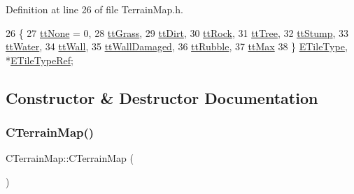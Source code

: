 Definition at line 26 of file Terrain\+Map.\+h.


\begin{DoxyCode}
26                     \{
27             \hyperlink{classCTerrainMap_aff2ab991e237269941416dd79d8871d4a481e779132fb16414d17870bd6229eb5}{ttNone} = 0,
28             \hyperlink{classCTerrainMap_aff2ab991e237269941416dd79d8871d4ae587716ed26a437b6ea33f0ac823d47a}{ttGrass},
29             \hyperlink{classCTerrainMap_aff2ab991e237269941416dd79d8871d4a49fb754039632e7127fca005dd95bab8}{ttDirt},
30             \hyperlink{classCTerrainMap_aff2ab991e237269941416dd79d8871d4a215740f194a2d72a21d47c848fbfecad}{ttRock},
31             \hyperlink{classCTerrainMap_aff2ab991e237269941416dd79d8871d4a15600fc22dc08ff5a3aec20930112f8c}{ttTree},
32             \hyperlink{classCTerrainMap_aff2ab991e237269941416dd79d8871d4ac6008e344fb024b62741b2ffaef042ef}{ttStump},
33             \hyperlink{classCTerrainMap_aff2ab991e237269941416dd79d8871d4ab7c7a2abbef411fd768a4f209e307de5}{ttWater},
34             \hyperlink{classCTerrainMap_aff2ab991e237269941416dd79d8871d4a9faa5ddca496d71c34b9d01157de34b2}{ttWall},
35             \hyperlink{classCTerrainMap_aff2ab991e237269941416dd79d8871d4acbd754bea3ab1493a28f3a67596482dd}{ttWallDamaged},
36             \hyperlink{classCTerrainMap_aff2ab991e237269941416dd79d8871d4a0969ea4c56acb3f5acf137c0d06a3371}{ttRubble},
37             \hyperlink{classCTerrainMap_aff2ab991e237269941416dd79d8871d4a63a0be7e3c2e41dcc569f3d335bd9a02}{ttMax}
38         \} \hyperlink{classCTerrainMap_aff2ab991e237269941416dd79d8871d4}{ETileType}, *\hyperlink{classCTerrainMap_a817b5c0c7f75205946ef7d0a2f49642e}{ETileTypeRef};
\end{DoxyCode}


\subsection{Constructor \& Destructor Documentation}
\hypertarget{classCTerrainMap_a2ac9c0f2622d06b8e0b1f5d67199f1ea}{}\label{classCTerrainMap_a2ac9c0f2622d06b8e0b1f5d67199f1ea} 
\subsubsection{\texorpdfstring{C\+Terrain\+Map()}{CTerrainMap()}\hspace{0.1cm}{\footnotesize\ttfamily [1/2]}}
{\footnotesize\ttfamily C\+Terrain\+Map\+::\+C\+Terrain\+Map (\begin{DoxyParamCaption}{ }\end{DoxyParamCaption})}



